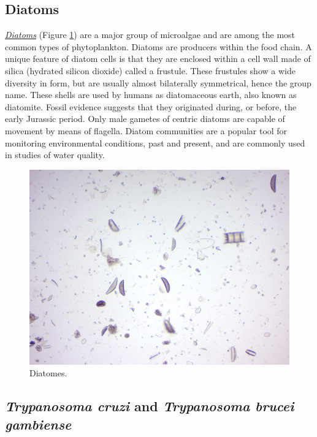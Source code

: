 \subsection{Diatoms}\label{diatoms}

\href{https://en.wikipedia.org/wiki/Diatom}{\emph{Diatoms}} (Figure
\ref{fig:diatomes}) are a major group of microalgae and are among the
most common types of phytoplankton. Diatoms are producers within the
food chain. A unique feature of diatom cells is that they are enclosed
within a cell wall made of silica (hydrated silicon dioxide) called a
frustule. These frustules show a wide diversity in form, but are usually
almost bilaterally symmetrical, hence the group name. These shells are
used by humans as diatomaceous earth, also known as diatomite. Fossil
evidence suggests that they originated during, or before, the early
Jurassic period. Only male gametes of centric diatoms are capable of
movement by means of flagella. Diatom communities are a popular tool for
monitoring environmental conditions, past and present, and are commonly
used in studies of water quality.

\begin{figure}

{\centering \includegraphics[width=0.7\linewidth]{./figures/protists/diatomes}

}

\caption{Diatomes.}\label{fig:diatomes}
\end{figure}

\subsection{\texorpdfstring{\emph{Trypanosoma cruzi} and
\emph{Trypanosoma brucei
gambiense}}{Trypanosoma cruzi and Trypanosoma brucei gambiense}}\label{trypanosoma-cruzi-and-trypanosoma-brucei-gambiense}

